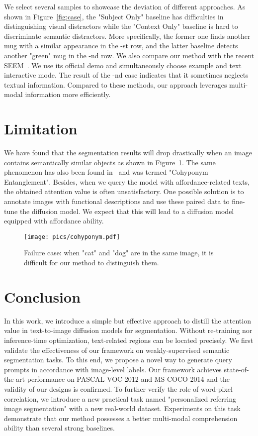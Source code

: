 \documentclass[letterpaper]{article} \usepackage[submission]{aaai24}  \usepackage{times}  \usepackage{helvet}  \usepackage{courier}  \usepackage[hyphens]{url}  \usepackage{graphicx} \urlstyle{rm} \def\UrlFont{\rm}  \usepackage{natbib}  \usepackage{caption} \frenchspacing  \setlength{\pdfpagewidth}{8.5in} \setlength{\pdfpageheight}{11in} \usepackage{algorithm}
\begin{document}
We select several samples to showcase the deviation of different approaches.
As shown in Figure~\ref{fig:case}, the "Subject Only" baseline has difficulties in distinguishing visual distractors while the "Context Only" baseline is hard to discriminate semantic distractors.
More specifically, the former one finds another mug with a similar appearance in the -st row, and the latter baseline detects another "green" mug in the -nd row.
We also compare our method with the recent SEEM~\cite{SEEM}.
We use its official demo and simultaneously choose example and text interactive mode.
The result of the -nd case indicates that it sometimes neglects textual information.
Compared to these methods, our approach leverages multi-modal information more efficiently.

\section{Limitation}
\label{sec:limitation}

We have found that the segmentation results will drop drastically when an image contains semantically similar objects as shown in Figure~\ref{fig:cohyponym}.
The same phenomenon has also been found in~\cite{daam} and was termed "Cohyponym Entanglement".
Besides, when we query the model with affordance-related texts, the obtained attention value is often unsatisfactory.
One possible solution is to annotate images with functional descriptions and use these paired data to fine-tune the diffusion model.
We expect that this will lead to a diffusion model equipped with affordance ability.
\begin{figure}
  \centering
  \texttt{[image: pics/cohyponym.pdf]}
  \caption{
Failure case: when "cat" and "dog" are in the same image, it is difficult for our method to distinguish them.
}
  \label{fig:cohyponym}
\end{figure}

\section{Conclusion}
\label{sec:conclusion}

In this work, we introduce a simple but effective approach to distill the attention value in text-to-image diffusion models for segmentation.
Without re-training nor inference-time optimization, text-related regions can be located precisely.
We first validate the effectiveness of our framework on weakly-supervised semantic segmentation tasks.
To this end, we propose a novel way to generate query prompts in accordance with image-level labels.
Our framework achieves state-of-the-art performance on PASCAL VOC 2012 and MS COCO 2014 and the validity of our designs is confirmed.
To further verify the role of word-pixel correlation, we introduce a new practical task named "personalized referring image segmentation" with a new real-world dataset.
Experiments on this task demonstrate that our method possesses a better multi-modal comprehension ability than several strong baselines.
\end{document}
